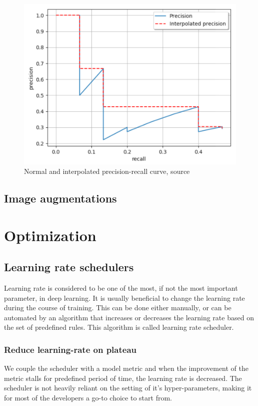 \begin{figure}
    \includegraphics[width = \linewidth]{images/PR-curve.png}
    \caption{Normal and interpolated precision-recall curve, source \cite{Padilla2020}}
    \label{fig:pr_curve}
\end{figure}


\subsection{Image augmentations}


\section{Optimization}
\subsection{Learning rate schedulers}
Learning rate is considered to be one of the most, if not the most important parameter, in deep learning. It  is usually beneficial to change the learning rate during the course of training. This can be done either manually, or can be automated by an algorithm that increases or decreases the learning rate based on the set of predefined rules. This algorithm is called learning rate scheduler.

\subsubsection{Reduce learning-rate on plateau}
We couple the scheduler with a model metric and when the improvement of the metric stalls for predefined period of time, the learning rate is decreased.
The scheduler is not heavily reliant on the setting of it's hyper-parameters, making it for most of the developers a go-to choice to start from.




